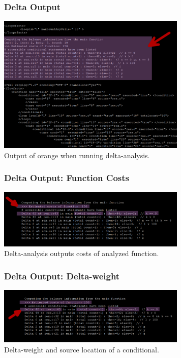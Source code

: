 \documentclass{beamer}
\begin{document}
\begin{frame}[fragile]
  \frametitle{Delta Output}

  \begin{center}
    \includegraphics[width=9cm]{img/delta_output_all.pdf} \\

    \bigskip
    Output of orange when running delta-analysis.
  \end{center}
\end{frame} 



\begin{frame}[fragile]
  \frametitle{Delta Output: Function Costs}

  \begin{center}
    \includegraphics[width=9cm]{img/dd1.pdf} \\

    \bigskip
    Delta-analysis outputs costs of analyzed function.
  \end{center}
\end{frame} 



\begin{frame}[fragile]
  \frametitle{Delta Output: Delta-weight}

  \begin{center}
    \includegraphics[width=9cm]{img/dd2.pdf} \\

    \bigskip
    Delta-weight and source location of a conditional.
  \end{center}
\end{frame} 
\end{document}
